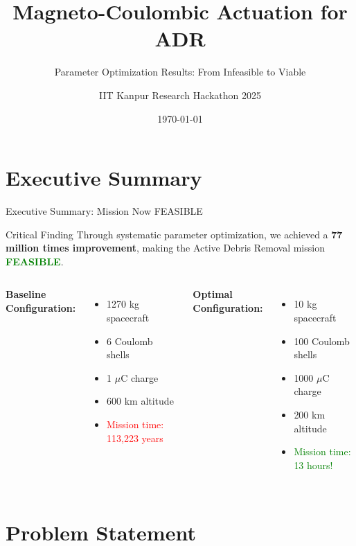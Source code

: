 \documentclass[11pt]{beamer}
\title{Magneto-Coulombic Actuation for ADR}
\subtitle{Parameter Optimization Results: From Infeasible to Viable}
\author{IIT Kanpur Research Hackathon 2025}
\date{\today}
\begin{document}
\begin{frame}
\titlepage
\end{frame}

\section{Executive Summary}

\begin{frame}{Executive Summary: Mission Now FEASIBLE}
\begin{block}{Critical Finding}
Through systematic parameter optimization, we achieved a \textbf{77 million times improvement}, making the Active Debris Removal mission \textcolor{green}{\textbf{FEASIBLE}}.
\end{block}

\vspace{0.3cm}

\begin{columns}[t]
\textbf{Baseline Configuration:}
\begin{itemize}
\item 1270 kg spacecraft
\item 6 Coulomb shells
\item 1 $\mu$C charge
\item 600 km altitude
\item \textcolor{red}{Mission time: 113,223 years}
\end{itemize}

\textbf{Optimal Configuration:}
\begin{itemize}
\item 10 kg spacecraft
\item 100 Coulomb shells
\item 1000 $\mu$C charge
\item 200 km altitude
\item \textcolor{green}{Mission time: 13 hours!}
\end{itemize}
\end{columns}

\end{frame}

\section{Problem Statement}
\end{document}
